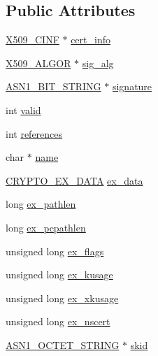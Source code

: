 \subsection*{Public Attributes}
\begin{DoxyCompactItemize}
\item 
\hyperlink{x509_8h_adf52d084ce690fb5335dce1c5ebd0502}{X509\+\_\+\+C\+I\+NF} $\ast$ \hyperlink{structx509__st_abbae6a9fb14b3145b04b98f24128be71}{cert\+\_\+info}
\item 
\hyperlink{ossl__typ_8h_aa2b6185e6254f36f709cd6577fb5022e}{X509\+\_\+\+A\+L\+G\+OR} $\ast$ \hyperlink{structx509__st_a90d06c88fff740923082fa98b7b86b27}{sig\+\_\+alg}
\item 
\hyperlink{ossl__typ_8h_af837aaa00e151b1e8773aea5a8fe1cc4}{A\+S\+N1\+\_\+\+B\+I\+T\+\_\+\+S\+T\+R\+I\+NG} $\ast$ \hyperlink{structx509__st_a8a1e43923e1855fb1dbfe15730cd5e7f}{signature}
\item 
int \hyperlink{structx509__st_a1e506073c0b53c10a6007f5fa9428c35}{valid}
\item 
int \hyperlink{structx509__st_ab1114b325664bca1cdfd6854f247a4d5}{references}
\item 
char $\ast$ \hyperlink{structx509__st_a447f3d7de20099a3a45fcc361a2d8f02}{name}
\item 
\hyperlink{ossl__typ_8h_a7eaff1c18057495d8af18f22d1370b51}{C\+R\+Y\+P\+T\+O\+\_\+\+E\+X\+\_\+\+D\+A\+TA} \hyperlink{structx509__st_a388ec405fa7f267e4ce5fbcbc9ccbc91}{ex\+\_\+data}
\item 
long \hyperlink{structx509__st_a9e9ea838b4395a05a70485526f05a152}{ex\+\_\+pathlen}
\item 
long \hyperlink{structx509__st_a80c2e990274c6d80a0d2e8bc87850d59}{ex\+\_\+pcpathlen}
\item 
unsigned long \hyperlink{structx509__st_afc5106add019789df9b25ab6a1ff07ce}{ex\+\_\+flags}
\item 
unsigned long \hyperlink{structx509__st_aa22af4cd664504cf5d8f910bc2dc4caf}{ex\+\_\+kusage}
\item 
unsigned long \hyperlink{structx509__st_a476d2351651a42fae4b5a8cf9d67ae8e}{ex\+\_\+xkusage}
\item 
unsigned long \hyperlink{structx509__st_ae26ccfc73c4ca44fc360d90c894f321c}{ex\+\_\+nscert}
\item 
\hyperlink{ossl__typ_8h_afbd05e94e0f0430a2b729473efec88c1}{A\+S\+N1\+\_\+\+O\+C\+T\+E\+T\+\_\+\+S\+T\+R\+I\+NG} $\ast$ \hyperlink{structx509__st_a6ebe771c246586c77c91f2deca26b84d}{skid}
\item 

\end{DoxyCompactItemize}
